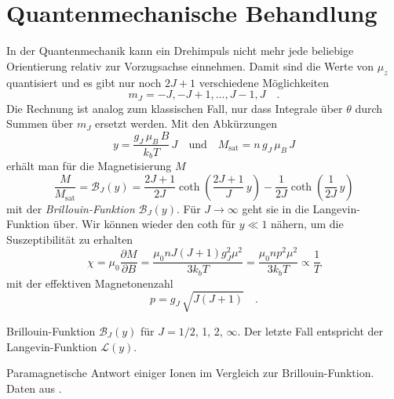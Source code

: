 \section{Quantenmechanische Behandlung}

In der Quantenmechanik kann ein Drehimpuls nicht mehr jede beliebige Orientierung relativ zur Vorzugsachse einnehmen. Damit sind die  Werte von $\mu_z$ quantisiert und es gibt nur noch $2J +1$ verschiedene Möglichkeiten
\begin{equation}
    m_J = -J, -J +1 , \dots , J - 1, J  \quad .
\end{equation}
 Die Rechnung ist analog zum klassischen Fall, nur dass Integrale über $\theta$ durch Summen über $m_J$ ersetzt werden.
 Mit den Abkürzungen
\begin{equation}
    y = \frac{g_J \, \mu_B \, B}{k_b T} \, J \quad \text{und} \quad M_\text{sat} = n \, g_J \, \mu_B \, J
\end{equation}
erhält man für die Magnetisierung $M$
\begin{equation}
    \frac{M}{M_\text{sat}} = \mathcal{B}_J(y) = 
    \frac{2J +1}{2J } \coth \left( \frac{2J+1}{J} \, y \right) - 
    \frac{1}{2J} \coth \left( \frac{1}{2J} \, y \right)  \label{eq:7_Brillouin_Funktion}
\end{equation}
mit der \emph{Brillouin-Funktion} $\mathcal{B}_J(y)$. Für $J \rightarrow \infty$ geht sie in die Langevin-Funktion über. Wir können wieder den coth für $y \ll 1$ nähern, um die Suszeptibilität zu erhalten
\begin{equation}
    \chi = \mu_0 \frac{\partial M}{\partial B} = \frac{\mu_0 n J (J+1) g_J^2 \mu^2}{3 k_b T}
  =    \frac{\mu_0 n p^2 \mu^2}{3 k_b T}
    \propto \frac{1}{T} \label{eq:7_chi_brillouin}
\end{equation}
mit der effektiven Magnetonenzahl
\begin{equation}
    p = g_J \, \sqrt{J (J+1)} \quad .
\end{equation}

\begin{marginfigure}[-50mm]
    \caption{Brillouin-Funktion $\mathcal{B}_J(y)$ für $J = 1/2$, 1, 2, $\infty$. Der letzte Fall entspricht der Langevin-Funktion $\mathcal{L}(y)$. }
\end{marginfigure}

\begin{marginfigure}
    \caption{Paramagnetische Antwort einiger Ionen im Vergleich zur Brillouin-Funktion. Daten aus \cite{Henry1952}. }
\end{marginfigure}
    





